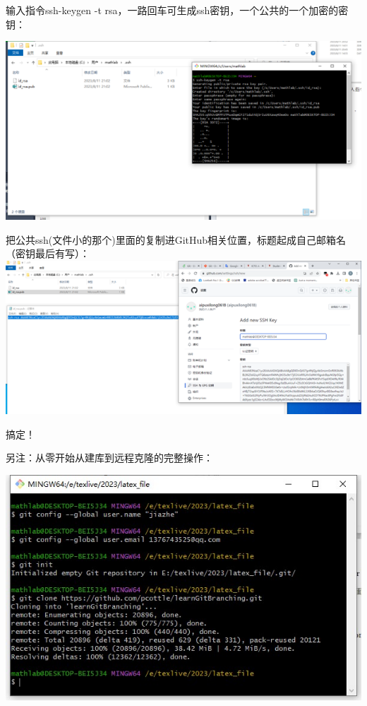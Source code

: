 \documentclass{article}
\begin{document}
输入指令ssh-keygen -t rsa，一路回车可生成ssh密钥，一个公共的一个加密的密钥：

\includegraphics{image/10.2.png}
\begin{flushleft}
把公共ssh(文件小的那个)里面的复制进GitHub相关位置，标题起成自己邮箱名（密钥最后有写）： \includegraphics{image/10.3.png}

搞定！  

另注：从零开始从建库到远程克隆的完整操作：
\end{flushleft}

\includegraphics{image/图片1.jpg}
\end{document}

